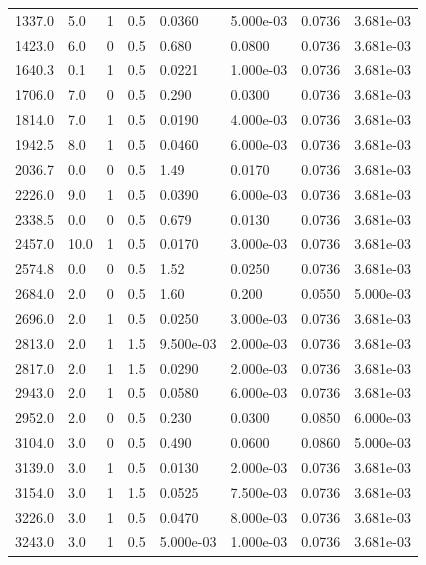 \documentclass[preview]{standalone}
\begin{document}
{{\begin{tabular}{L{1.2cm}C{1.2cm} C{0.3cm}C{0.5cm} C{1.4cm}C{1.4cm} C{1.4cm}C{1.4cm}}
  1337.0  &   5.0  & 1     & 0.5 &  0.0360  & 5.000e-03  & 0.0736 &  3.681e-03   \\ 
  1423.0  &   6.0  & 0     & 0.5 &  0.680  & 0.0800  & 0.0736 &  3.681e-03   \\ 
  1640.3  &   0.1  & 1     & 0.5 &  0.0221  & 1.000e-03  & 0.0736 &  3.681e-03   \\ 
  1706.0  &   7.0  & 0     & 0.5 &  0.290  & 0.0300  & 0.0736 &  3.681e-03   \\ 
  1814.0  &   7.0  & 1     & 0.5 &  0.0190  & 4.000e-03  & 0.0736 &  3.681e-03   \\ 
  1942.5  &   8.0  & 1     & 0.5 &  0.0460  & 6.000e-03  & 0.0736 &  3.681e-03   \\ 
  2036.7  &   0.0  & 0     & 0.5 &  1.49  & 0.0170  & 0.0736 &  3.681e-03   \\ 
  2226.0  &   9.0  & 1     & 0.5 &  0.0390  & 6.000e-03  & 0.0736 &  3.681e-03   \\ 
  2338.5  &   0.0  & 0     & 0.5 &  0.679  & 0.0130  & 0.0736 &  3.681e-03   \\ 
  2457.0  &  10.0  & 1     & 0.5 &  0.0170  & 3.000e-03  & 0.0736 &  3.681e-03   \\ 
  2574.8  &   0.0  & 0     & 0.5 &  1.52  & 0.0250  & 0.0736 &  3.681e-03   \\ 
  2684.0  &   2.0  & 0     & 0.5 &  1.60  & 0.200  & 0.0550 &  5.000e-03   \\ 
  2696.0  &   2.0  & 1     & 0.5 &  0.0250  & 3.000e-03  & 0.0736 &  3.681e-03   \\ 
  2813.0  &   2.0  & 1     & 1.5 &  9.500e-03  & 2.000e-03  & 0.0736 &  3.681e-03   \\ 
  2817.0  &   2.0  & 1     & 1.5 &  0.0290  & 2.000e-03  & 0.0736 &  3.681e-03   \\ 
  2943.0  &   2.0  & 1     & 0.5 &  0.0580  & 6.000e-03  & 0.0736 &  3.681e-03   \\ 
  2952.0  &   2.0  & 0     & 0.5 &  0.230  & 0.0300  & 0.0850 &  6.000e-03   \\ 
  3104.0  &   3.0  & 0     & 0.5 &  0.490  & 0.0600  & 0.0860 &  5.000e-03   \\ 
  3139.0  &   3.0  & 1     & 0.5 &  0.0130  & 2.000e-03  & 0.0736 &  3.681e-03   \\ 
  3154.0  &   3.0  & 1     & 1.5 &  0.0525  & 7.500e-03  & 0.0736 &  3.681e-03   \\ 
  3226.0  &   3.0  & 1     & 0.5 &  0.0470  & 8.000e-03  & 0.0736 &  3.681e-03   \\ 
  3243.0  &   3.0  & 1     & 0.5 &  5.000e-03  & 1.000e-03  & 0.0736 &  3.681e-03   \\ 

\end{tabular}}}
\end{document}

